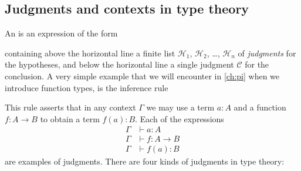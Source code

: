 \subsection{Judgments and contexts in type theory}\label{sec:judgments}
An  is an expression of the form
\begin{prooftree}
\end{prooftree}
containing above the horizontal line a finite list $\mathcal{H}_1$, $\mathcal{H}_2$, \dots, $\mathcal{H}_n$ of \emph{judgments} for the hypotheses, and below the horizontal line a single judgment $\mathcal{C}$ for the conclusion. A very simple example that we will encounter in \cref{ch:pi} when we introduce function types, is the inference rule
\begin{prooftree}
\end{prooftree}
This rule asserts that in any context $\Gamma$ we may use a term $a:A$ and a function $f:A\to B$ to obtain a term $f(a):B$. Each of the expressions
\begin{align*}
  \Gamma & \vdash a :A \\
  \Gamma & \vdash f : A \to B \\
  \Gamma & \vdash f(a):B
\end{align*}
are examples of judgments. There are four kinds of judgments in type theory:
